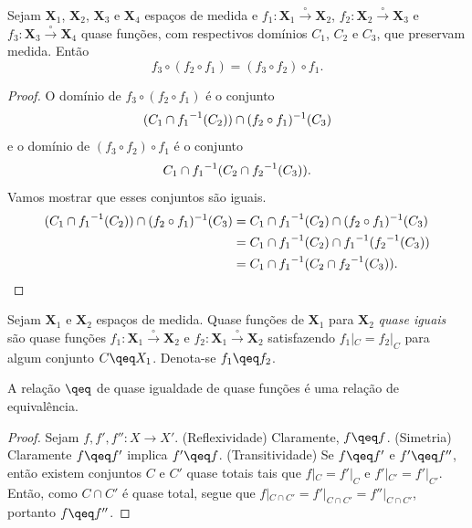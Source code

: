 \begin{prop}[Associatividade]
Sejam $\bm X_1$, $\bm X_2$, $\bm X_3$ e $\bm X_4$ espaços de medida e $f_1\colon \bm X_1 \overset{\circ}{\to} \bm X_2$, $f_2\colon \bm X_2 \overset{\circ}{\to} \bm X_3$ e $f_3\colon \bm X_3 \overset{\circ}{\to} \bm X_4$ quase funções, com respectivos domínios $C_1$, $C_2$ e $C_3$, que preservam medida. Então
	\begin{equation*}
	f_3 \circ (f_2 \circ f_1) = (f_3 \circ f_2) \circ f_1.
	\end{equation*}
\end{prop}
\begin{proof}
O domínio de $f_3 \circ (f_2 \circ f_1)$ é o conjunto
	\begin{equation*}
	(C_1 \cap {f_1}^{-1}(C_2)) \cap (f_2 \circ f_1)^{-1}(C_3)
	\end{equation*}
e o domínio de $(f_3 \circ f_2) \circ f_1$ é o conjunto
	\begin{equation*}
	C_1 \cap {f_1}^{-1}(C_2 \cap {f_2}^{-1}(C_3)).
	\end{equation*}
Vamos mostrar que esses conjuntos são iguais.
	\begin{align*}
	(C_1 \cap {f_1}^{-1}(C_2)) \cap (f_2 \circ f_1)^{-1}(C_3) &= C_1 \cap {f_1}^{-1}(C_2) \cap (f_2 \circ f_1)^{-1}(C_3) \\
		&= C_1 \cap {f_1}^{-1}(C_2) \cap {f_1}^{-1}({f_2}^{-1}(C_3)) \\
		&= C_1 \cap {f_1}^{-1}(C_2 \cap {f_2}^{-1}(C_3)).
	\end{align*}
\end{proof}

\begin{defi}
Sejam $\bm X_1$ e $\bm X_2$ espaços de medida. Quase funções de $\bm X_1$ para $\bm X_2$ \emph{quase iguais} são quase funções $f_1\colon \bm X_1 \overset{\circ}{\to} \bm X_2$ e $f_2\colon \bm X_1 \overset{\circ}{\to} \bm X_2$ satisfazendo $f_1|_C = f_2|_C$ para algum conjunto $C \qeq X_1$. Denota-se $f_1 \qeq f_2$.
\end{defi}

\begin{prop}
A relação $\qeq$ de quase igualdade de quase funções é uma relação de equivalência.
\end{prop}
\begin{proof}
Sejam $f,f',f''\colon X \to X'$. (Reflexividade) Claramente, $f \qeq f$. (Simetria) Claramente $f \qeq f'$ implica $f' \qeq f$. (Transitividade) Se $f \qeq f'$ e $f' \qeq f''$, então existem conjuntos $C$ e $C'$ quase totais tais que $f|_C = f'|_C$ e $f'|_{C'} = f'|_{C'}$. Então, como $C \cap C'$ é quase total, segue que $f|_{C \cap C'} = f'|_{C \cap C'} = f''|_{C \cap C'}$, portanto $f \qeq f''$.
\end{proof}







